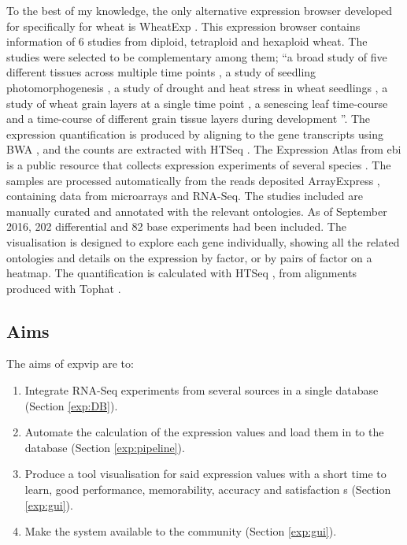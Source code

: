 To the best of my knowledge, the only alternative expression browser developed for specifically for wheat is WheatExp \citep{Pearce2015b}. 
This expression browser contains information of 6 studies from diploid, tetraploid and hexaploid wheat. 
The studies were selected to be complementary among them; ``a broad study of five different tissues across multiple time points \citep{Choulet2014}, a study of seedling photomorphogenesis \citep{Fox2014}, a study of drought and heat stress in wheat seedlings \citep{Liu2015}, a study of wheat grain layers at a single time point \citep{Pearce2015}, a senescing leaf time-course \citep{Pearce2014} and a time-course of different grain tissue layers during development \citep{Pfeifer2014}''.
The expression quantification is produced by aligning to the gene transcripts using BWA \citep{Li2010}, and the counts are extracted with HTSeq \citep{Anders2015}. 
The Expression Atlas from \acrshort{ebi} is a public resource that collects expression experiments of several species \citep{Petryszak2016}. 
The samples are processed automatically from the reads deposited ArrayExpress \citep{Kolesnikov2015}, containing data from microarrays and RNA-Seq.
The studies included are manually curated and annotated with the relevant ontologies. 
As of September 2016, 202 differential and 82 base experiments had been included. 
The visualisation is designed to explore each gene individually, showing all the related ontologies and details on the expression by factor, or by pairs of factor on a heatmap. 
The quantification is calculated with HTSeq \citep{Anders2015}, from alignments produced with Tophat \citep{Ling2013}.


\subsection{Aims}
\label{exp:aims}
The aims of \gls{expvip} are to:
\begin{enumerate}
\item Integrate RNA-Seq experiments from several sources in a single database (Section \ref{exp:DB}). 
\item Automate the calculation of the expression values and load them in to the database (Section \ref{exp:pipeline}).
\item Produce a tool  visualisation for said expression values with a short time to learn, good performance, memorability, accuracy and satisfaction s (Section \ref{exp:gui}).
\item Make the system available to the community (Section \ref{exp:gui}).
\end{enumerate}

